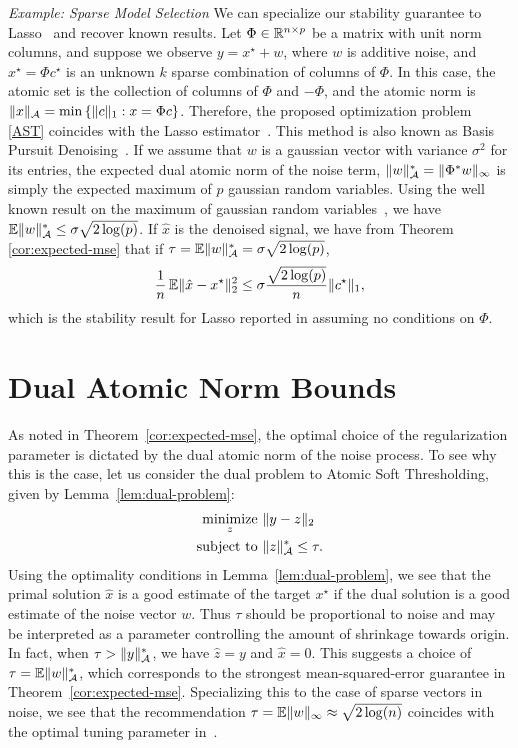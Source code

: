 \noindent\emph{Example: Sparse Model Selection} We can specialize our stability
guarantee to Lasso~\cite{tibshirani96} and recover known results. Let $\Phi \in
\mathbb{R}^{n \times p}$ be a matrix with unit norm columns, and suppose we observe
$y = x^\star + w$, where $w$ is additive noise, and $x^\star = \Phi
c^\star$ is an unknown $k$ sparse combination of columns of $\Phi$. In this
case, the atomic set is the collection of columns of $\Phi$ and $-\Phi$, and
the atomic norm is $\lVert x\rVert_{\mathcal{A}} = \min \left\{\lVert c\rVert_1: x = \Phi c\right\}$.
Therefore, the proposed optimization
problem \eqref{AST} coincides with the Lasso estimator~\cite{tibshirani96}.
This method is also known as Basis Pursuit Denoising~\cite{chen98}. If we
assume that $w$ is a gaussian vector with variance $\sigma^2$ for its entries,
the expected dual atomic norm of the noise term, $\lVert w\rVert_{\mathcal{A}}^* =
\lVert\Phi^*w\rVert_\infty$ is simply the expected maximum of $p$ gaussian random
variables. Using the well known result on the maximum of gaussian random
variables~\cite{lr76}, we have $\operatorname{\mathbb{E}}\lVert w\rVert_{\mathcal{A}}^* \leq \sigma \sqrt{2 \log(p)}$.
If $\hat{x}$ is the denoised signal, we have from Theorem
\ref{cor:expected-mse} that if $\tau = \operatorname{\mathbb{E}}\lVert w\rVert_{\mathcal{A}}^* = \sigma \sqrt{2
\log(p)}$, \[ \frac{1}{n}\operatorname{\mathbb{E}}\lVert\hat{x} - x^\star\rVert_2^2 \leq \sigma
\frac{\sqrt{2\log(p)} }{n} \lVert c^\star\rVert_1, \] which is the stability result
for Lasso reported in \cite{greenshtein04} assuming no conditions on $\Phi$.

\section{Dual Atomic Norm Bounds} %
\label{sec:dual-atomic-bounds}
As noted in Theorem~\ref{cor:expected-mse}, the optimal choice of the
regularization parameter is dictated by the dual atomic norm of the noise
process. To see why this is the case, let us consider the dual problem to Atomic
Soft Thresholding, given by Lemma~\ref{lem:dual-problem}:
\begin{equation*}
  \begin{split} \mathop{\operatorname{minimize}}_z~&\lVert y - z\rVert_2\\
	 \text{subject to }&\lVert z\rVert_{\mathcal{A}}^* \leq \tau.
  \end{split}
\end{equation*} 
Using the optimality conditions in Lemma~\ref{lem:dual-problem}, we see that the
primal solution $\hat{x}$ is a good estimate of the target $x^\star$ if the dual
solution is a good estimate of the noise vector $w$. Thus $\tau$ should be
proportional to noise and may be interpreted as a parameter controlling the
amount of shrinkage towards origin. In fact, when $\tau > \lVert y\rVert_{\mathcal{A}}^*$, we
have $\hat{z} = y$ and $\hat{x} = 0.$ This suggests a choice of $\tau = \operatorname{\mathbb{E}}
\lVert w\rVert_{\mathcal{A}}^*$, which corresponds to the strongest mean-squared-error guarantee
in Theorem~\ref{cor:expected-mse}. Specializing this to the case of sparse
vectors in noise, we see that the recommendation $\tau = \operatorname{\mathbb{E}} \lVert w\rVert_\infty
\approx \sqrt{2 \log(n)}$ coincides with the optimal tuning parameter
in~\cite{donoho1995noising}.

